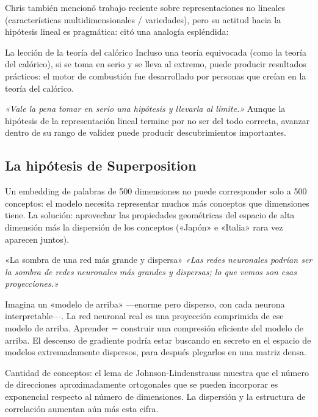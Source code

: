 Chris también mencionó trabajo reciente sobre representaciones no lineales (características multidimensionales / variedades), pero su actitud hacia la hipótesis lineal es pragmática: citó una analogía espléndida:

\begin{knowledgebox}{La lección de la teoría del calórico}
Incluso una teoría equivocada (como la teoría del calórico), si se toma en serio y se lleva al extremo, puede producir resultados prácticos: el motor de combustión fue desarrollado por personas que creían en la teoría del calórico.

\textit{«Vale la pena tomar en serio una hipótesis y llevarla al límite.»} Aunque la hipótesis de la representación lineal termine por no ser del todo correcta, avanzar dentro de su rango de validez puede producir descubrimientos importantes.
\end{knowledgebox}

\subsection{La hipótesis de Superposition}

Un embedding de palabras de 500 dimensiones no puede corresponder solo a 500 conceptos: el modelo necesita representar muchos más conceptos que dimensiones tiene. La solución: aprovechar las propiedades geométricas del espacio de alta dimensión más la dispersión de los conceptos («Japón» e «Italia» rara vez aparecen juntos).

\begin{importantbox}{«La sombra de una red más grande y dispersa»}
\textit{«Las redes neuronales podrían ser la sombra de redes neuronales más grandes y dispersas; lo que vemos son esas proyecciones.»}

Imagina un «modelo de arriba» —enorme pero disperso, con cada neurona interpretable—. La red neuronal real es una proyección comprimida de ese modelo de arriba. Aprender = construir una compresión eficiente del modelo de arriba. El descenso de gradiente podría estar buscando en secreto en el espacio de modelos extremadamente dispersos, para después plegarlos en una matriz densa.

Cantidad de conceptos: el lema de Johnson-Lindenstrauss muestra que el número de direcciones aproximadamente ortogonales que se pueden incorporar es exponencial respecto al número de dimensiones. La dispersión y la estructura de correlación aumentan aún más esta cifra.
\end{importantbox}

